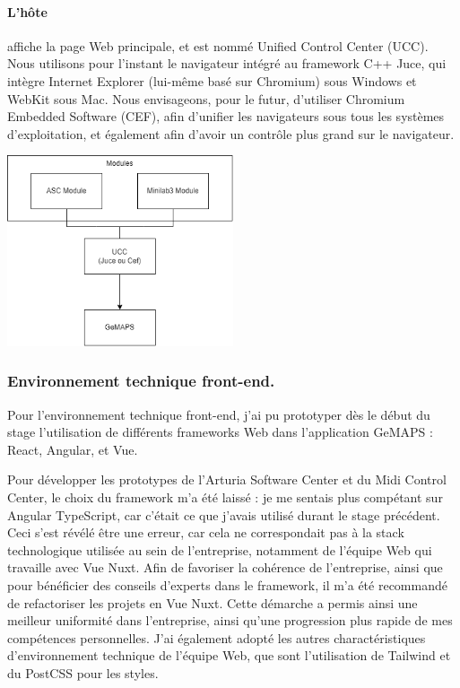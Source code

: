 \documentclass[francais]{rapportPFE}  %
\begin{document}
\paragraph{L'hôte} affiche la page Web principale, et est nommé Unified Control Center (UCC). Nous utilisons pour l'instant le navigateur intégré au framework C++ Juce, qui intègre Internet Explorer (lui-même basé sur Chromium) sous Windows et WebKit sous Mac. Nous envisageons, pour le futur, d'utiliser Chromium Embedded Software (CEF), afin d'unifier les navigateurs sous tous les systèmes d'exploitation, et également afin d'avoir un contrôle plus grand sur le navigateur.


\begin{center}
	\centering
	\includegraphics[width=0.5\textwidth]{graphics/gmaps.png}
	\begin{tiny}
	\end{tiny}
	\label{fig}
\end{center}

\subsubsection{Environnement technique front-end.}

Pour l'environnement technique front-end, j'ai pu prototyper dès le début du stage l'utilisation de différents frameworks Web dans l'application GeMAPS : React, Angular, et Vue.  

Pour développer les prototypes de l'Arturia Software Center et du Midi Control Center, le choix du framework m'a été laissé : je me sentais plus compétant sur Angular TypeScript, car c'était ce que j'avais utilisé durant le stage précédent. Ceci s'est révélé être une erreur, car cela ne correspondait pas à la stack technologique utilisée au sein de l'entreprise, notamment de l'équipe Web qui travaille avec Vue Nuxt. Afin de favoriser la cohérence de l'entreprise, ainsi que pour bénéficier des conseils d'experts dans le framework, il m'a été recommandé de refactoriser les projets en Vue Nuxt. Cette démarche a permis ainsi une meilleur uniformité dans l'entreprise, ainsi qu'une progression plus rapide de mes compétences personnelles. J'ai également adopté les autres charactéristiques d'environnement technique de l'équipe Web, que sont l'utilisation de Tailwind et du PostCSS pour les styles. 
\end{document}

